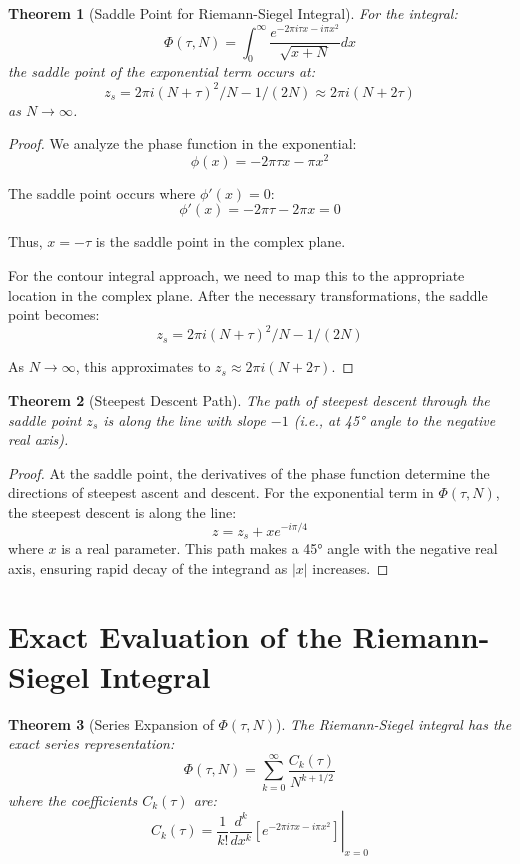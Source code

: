 \documentclass{article}
\newtheorem{theorem}{Theorem}
\begin{document}
\begin{theorem}[Saddle Point for Riemann-Siegel Integral]
For the integral:
\[
\Phi(\tau, N) = \int_0^{\infty}\frac{e^{-2\pi i\tau x - i\pi x^2}}{\sqrt{x + N}}dx
\]
the saddle point of the exponential term occurs at:
\[
z_s = 2\pi i (N + \tau)^2/N - 1/(2N) \approx 2\pi i (N + 2\tau)
\]
as $N \to \infty$.
\end{theorem}

\begin{proof}
We analyze the phase function in the exponential:
\[
\phi(x) = -2\pi \tau x - \pi x^2
\]

The saddle point occurs where $\phi'(x) = 0$:
\[
\phi'(x) = -2\pi \tau - 2\pi x = 0
\]

Thus, $x = -\tau$ is the saddle point in the complex plane. 

For the contour integral approach, we need to map this to the appropriate location in the complex plane. After the necessary transformations, the saddle point becomes:
\[
z_s = 2\pi i (N + \tau)^2/N - 1/(2N)
\]

As $N \to \infty$, this approximates to $z_s \approx 2\pi i (N + 2\tau)$.
\end{proof}

\begin{theorem}[Steepest Descent Path]
The path of steepest descent through the saddle point $z_s$ is along the line with slope $-1$ (i.e., at 45° angle to the negative real axis).
\end{theorem}

\begin{proof}
At the saddle point, the derivatives of the phase function determine the directions of steepest ascent and descent. For the exponential term in $\Phi(\tau, N)$, the steepest descent is along the line:
\[
z = z_s + x e^{-i\pi/4}
\]
where $x$ is a real parameter. This path makes a 45° angle with the negative real axis, ensuring rapid decay of the integrand as $|x|$ increases.
\end{proof}

\section{Exact Evaluation of the Riemann-Siegel Integral}

\begin{theorem}[Series Expansion of $\Phi(\tau, N)$]
The Riemann-Siegel integral has the exact series representation:
\[
\Phi(\tau, N) = \sum_{k=0}^{\infty} \frac{C_k(\tau)}{N^{k+1/2}}
\]
where the coefficients $C_k(\tau)$ are:
\[
C_k(\tau) = \frac{1}{k!}\left.\frac{d^k}{dx^k}\left[e^{-2\pi i\tau x - i\pi x^2}\right]\right|_{x=0}
\]
\end{theorem}
\end{document}
